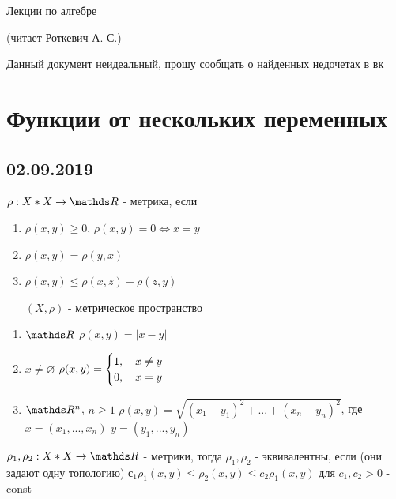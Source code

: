 \documentclass[11pt]{article}
\begin{document}
\begin{center}
  \huge Лекции по алгебре
  
  (читает Роткевич А. С.)
\end{center}
Данный документ неидеальный, прошу сообщать о найденных недочетах в \href{https://vk.com/drab_existence_a}{вк}
\tableofcontents
\newpage

\section{Функции от нескольких переменных}
\subsection{02.09.2019}

\begin{definition}
    $\rho: X * X \rightarrow \R$ - метрика, если
    \begin{enumerate}                               
    	\item $\rho(x,y) \geqslant 0$, $\rho(x,y)=0 \Leftrightarrow x=y$
    	\item $\rho(x,y)=\rho(y,x)$
    	\item $\rho(x,y) \leqslant \rho(x,z)+\rho(z,y)$
    	
    	$(X,\rho)$ - метрическое пространство
	\end{enumerate} 
\end{definition}

\begin{instances}
    \begin{enumerate}  
        \item $\R$ $\rho(x,y)=|x-y|$
        \item $x \neq \varnothing$ $\rho(x,y)=
            \begin{cases}
                1, \quad x \neq y\\
                0, \quad x=y
            \end{cases}$
        \item $\R^n$, $n \geqslant 1$ $\rho(x,y)=\sqrt{(x_1-y_1)^2+...+(x_n-y_n)^2}$, где $x=(x_1,...,x_n)$ $y=(y_1,...,y_n)$
    \end{enumerate} 
\end{instances}

\begin{definition}
    $\rho_1, \rho_2: X*X \rightarrow \R$ - метрики, тогда $\rho_1, \rho_2$ - эквивалентны, если (они задают одну топологию) $с_1 \rho_1 (x,y) \leqslant \rho_2 (x,y) \leqslant c_2 \rho_1(x,y)$ для $c_1,c_2>0$ - const
\end{definition}
\end{document}
